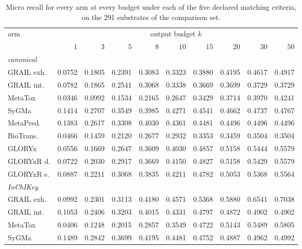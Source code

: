\begin{table}[t]
\centering\scriptsize
\begin{threeparttable}
\caption{Micro recall for every arm at every budget under each of the five declared matching criteria, on the 291 substrates of the comparison set.}
\label{tab:si-criterion-levels}
\setlength{\tabcolsep}{4pt}
\renewcommand{\arraystretch}{0.82}
\begin{tabular}{lrrrrrrrrr}
\toprule
arm & \multicolumn{9}{c}{output budget $k$} \\
\cmidrule(lr){2-10}
 & $1$ & $3$ & $5$ & $8$ & $10$ & $15$ & $20$ & $30$ & $50$ \\
\midrule
\multicolumn{10}{l}{\emph{canonical}} \\
\quad GRAIL exh. & 0.0752 & 0.1805 & 0.2391 & 0.3083 & 0.3323 & 0.3880 & 0.4195 & 0.4617 & 0.4917 \\
\quad GRAIL int. & 0.0782 & 0.1865 & 0.2541 & 0.3068 & 0.3338 & 0.3669 & 0.3699 & 0.3729 & 0.3729 \\
\quad MetaTox & 0.0346 & 0.0992 & 0.1534 & 0.2165 & 0.2647 & 0.3429 & 0.3714 & 0.3970 & 0.4241 \\
\quad SyGMa & 0.1414 & 0.2707 & 0.3549 & 0.3985 & 0.4271 & 0.4541 & 0.4662 & 0.4737 & 0.4767 \\
\quad MetaPred. & 0.1383 & 0.2617 & 0.3308 & 0.4030 & 0.4361 & 0.4481 & 0.4496 & 0.4496 & 0.4496 \\
\quad BioTrans. & 0.0466 & 0.1459 & 0.2120 & 0.2677 & 0.2932 & 0.3353 & 0.3459 & 0.3504 & 0.3504 \\
\quad GLORYx & 0.0556 & 0.1669 & 0.2647 & 0.3609 & 0.4030 & 0.4857 & 0.5158 & 0.5444 & 0.5579 \\
\quad GLORYxR d. & 0.0722 & 0.2030 & 0.2917 & 0.3669 & 0.4150 & 0.4827 & 0.5158 & 0.5429 & 0.5579 \\
\quad GLORYxR s. & 0.0887 & 0.2211 & 0.3068 & 0.3835 & 0.4211 & 0.4782 & 0.5053 & 0.5368 & 0.5564 \\
\midrule
\multicolumn{10}{l}{\emph{InChIKey}} \\
\quad GRAIL exh. & 0.0992 & 0.2301 & 0.3113 & 0.4180 & 0.4571 & 0.5368 & 0.5880 & 0.6541 & 0.7038 \\
\quad GRAIL int. & 0.1053 & 0.2406 & 0.3203 & 0.4015 & 0.4331 & 0.4797 & 0.4872 & 0.4902 & 0.4902 \\
\quad MetaTox & 0.0406 & 0.1248 & 0.2015 & 0.2857 & 0.3549 & 0.4722 & 0.5143 & 0.5489 & 0.5805 \\
\quad SyGMa & 0.1489 & 0.2842 & 0.3699 & 0.4195 & 0.4481 & 0.4752 & 0.4887 & 0.4962 & 0.4992 \\

\end{tabular}
\end{threeparttable}
\end{table}
